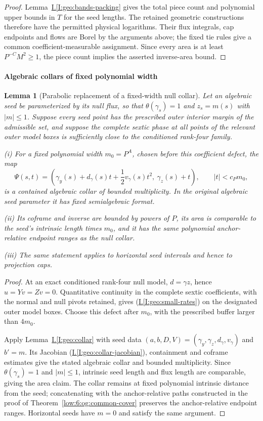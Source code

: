 \documentclass[11pt]{amsart}
\newtheorem{lemma}[theorem]{Lemma}
\theoremstyle{definition}
\theoremstyle{remark}
\numberwithin{equation}{section}
\newcommand{\partIref}[1]{\hyperref[I:#1]{I.\ref*{I:#1}}}
\newcommand{\partIeqref}[1]{\textup{(\partIref{#1})}}
\begin{document}
\begin{proof}
Lemma~\partIref{geo:bands-packing} gives the total piece count and polynomial upper bounds in \(T\) for the seed lengths. The retained geometric constructions therefore have the permitted physical logarithms. Their flux integrals, cap endpoints and flows are Borel by the arguments above; the fixed tie rules give a common coefficient-measurable assignment. Since every area is at least \(P^{-C}M^2\ge1\), the piece count implies the asserted inverse-area bound.
\end{proof}

\paragraph{Algebraic collars of fixed polynomial width}\label{low:6:og:fixed-collars}

\begin{lemma}[Parabolic replacement of a fixed-width null collar]\label{low:6:og:parabolic-collar}
Let an algebraic seed be parameterized by its null flux, so that $\theta(\gamma_s)=1$ and $z_s=m(s)$ with $|m|\le1$. Suppose every seed point has the prescribed outer interior margin of the admissible set, and suppose the complete sextic phase at all points of the relevant outer model boxes is sufficiently close to the conditioned rank-four family.

\noindent\textup{(i)} For a fixed polynomial width $m_0=P^A$, chosen before this coefficient defect, the map
\[
 \Psi(s,t)=\left(\gamma_y(s)+d_\gamma(s)t+\frac12v_\gamma(s)t^2,\ \gamma_z(s)+t\right),\qquad |t|<c_Pm_0,
\]
is a contained algebraic collar of bounded multiplicity. In the original algebraic seed parameter it has fixed semialgebraic format.

\noindent\textup{(ii)} Its coframe and inverse are bounded by powers of $P$, its area is comparable to the seed's intrinsic length times $m_0$, and it has the same polynomial anchor-relative endpoint ranges as the null collar.

\noindent\textup{(iii)} The same statement applies to horizontal seed intervals and hence to projection caps.
\end{lemma}
\begin{proof}
At an exact conditioned rank-four null model, $d=\gamma z$, hence $u=Yv=Zv=0$. Quantitative continuity in the complete sextic coefficients, with the normal and null pivots retained, gives \partIeqref{geo:small-rates} on the designated outer model boxes. Choose this defect after $m_0$, with the prescribed buffer larger than $4m_0$.

Apply Lemma~\partIref{geo:collar} with seed data $(a,b,D,V)=(\gamma_y,\gamma_z,d_\gamma,v_\gamma)$ and $b'=m$. Its Jacobian \partIeqref{geo:collar-jacobian}, containment and coframe estimates give the stated algebraic collar and bounded multiplicity. Since $\theta(\gamma_s)=1$ and $|m|\le1$, intrinsic seed length and flux length are comparable, giving the area claim. The collar remains at fixed polynomial intrinsic distance from the seed; concatenating with the anchor-relative paths constructed in the proof of Theorem~\ref{low:6:og:common-cover} preserves the anchor-relative endpoint ranges. Horizontal seeds have $m=0$ and satisfy the same argument.
\end{proof}
\end{document}
